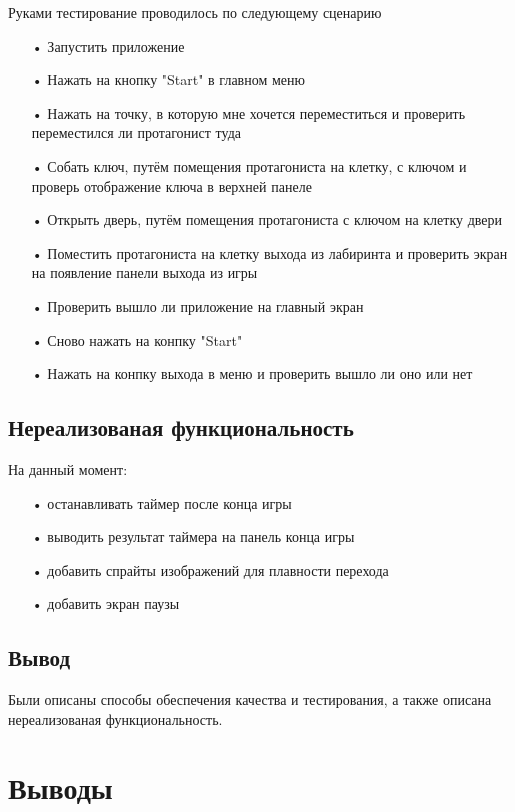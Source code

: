 Руками тестирование проводилось по следующему сценарию
\begin{enumerate}
\item[•]  Запустить приложение
\item[•]  Нажать на кнопку "Start" в главном меню
\item[•]  Нажать на точку, в которую мне хочется переместиться и проверить переместился ли протагонист туда
\item[•]  Собать ключ, путём помещения протагониста на клетку, с ключом и проверь отображение ключа в верхней панеле
\item[•]  Открыть дверь, путём помещения протагониста с ключом на клетку двери
\item[•]  Поместить протагониста на клетку выхода из лабиринта и проверить экран на появление панели выхода из игры
\item[•]  Проверить вышло ли приложение на главный экран
\item[•]  Сново нажать на конпку "Start"
\item[•]  Нажать на конпку выхода в меню и проверить вышло ли оно или нет
\end{enumerate}

\subsection{Нереализованая функциональность}

На данный момент:
\begin{enumerate}
\item[•]  останавливать таймер после конца игры
\item[•]  выводить результат таймера на панель конца игры
\item[•]  добавить спрайты изображений для плавности перехода
\item[•]  добавить экран паузы
\end{enumerate}

\subsection{Вывод}

Были описаны способы обеспечения качества и тестирования, а также описана нереализованая функциональность.

\section{Выводы}


